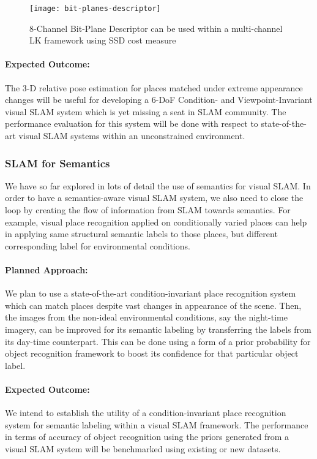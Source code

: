 \documentclass{article}
\begin{document}
\begin{figure}[htbp]
 \centering
 \texttt{[image: bit-planes-descriptor]}
 \caption{8-Channel Bit-Plane Descriptor can be used within a multi-channel LK framework using SSD cost measure \cite{alismail2016bit}}
 \label{fig:bit-plane-descriptor}
\end{figure}

\paragraph{Expected Outcome:}
The 3-D relative pose estimation for places matched under extreme appearance changes will be useful for developing a 6-DoF Condition- and Viewpoint-Invariant visual SLAM system which is yet missing a seat in SLAM community. The performance evaluation for this system will be done with respect to state-of-the-art visual SLAM systems within an unconstrained environment.

\subsubsection{SLAM for Semantics}
We have so far explored in lots of detail the use of semantics for visual SLAM. In order to have a semantics-aware visual SLAM system, we also need to close the loop by creating the flow of information from SLAM towards semantics. For example, visual place recognition applied on conditionally varied places can help in applying same structural semantic labels to those places, but different corresponding label for environmental conditions.

\paragraph{Planned Approach:}
We plan to use a state-of-the-art condition-invariant place recognition system which can match places despite vast changes in appearance of the scene. Then, the images from the non-ideal environmental conditions, say the night-time imagery, can be improved for its semantic labeling by transferring the labels from its day-time counterpart. This can be done using a form of a prior probability for object recognition framework to boost its confidence for that particular object label.

\paragraph{Expected Outcome:}
We intend to establish the utility of a condition-invariant place recognition system for semantic labeling within a visual SLAM framework. The performance in terms of accuracy of object recognition using the priors generated from a visual SLAM system will be benchmarked using existing or new datasets.
\end{document}
